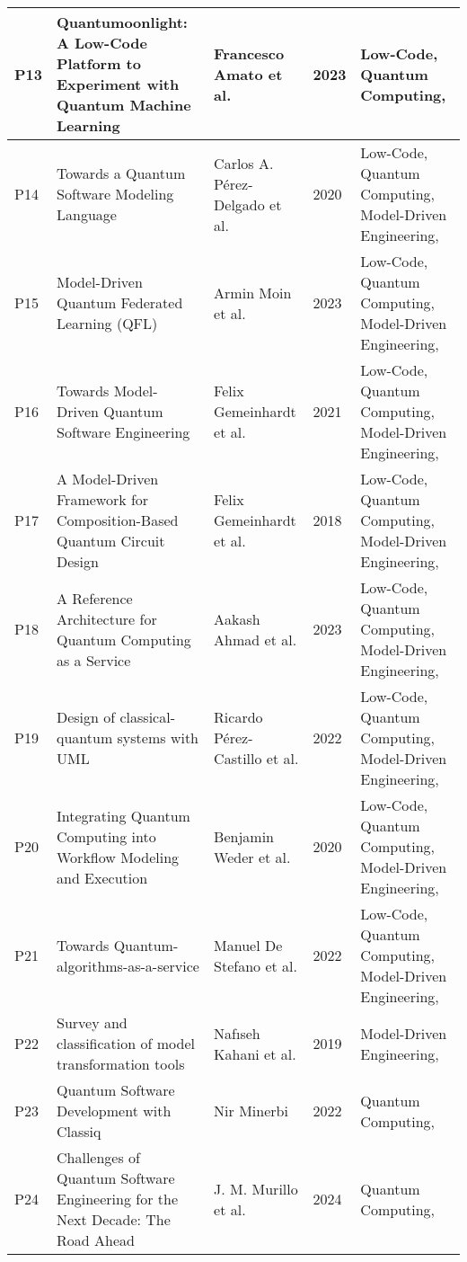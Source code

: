 \begin{longtable}{|m{0.8cm}|m{4.4cm}|m{3cm}|m{0.8cm}|m{4cm}|}
    P13 & Quantumoonlight: A Low-Code Platform to Experiment with Quantum Machine Learning & Francesco Amato et al. \cite{amato2023quantumoonlight} & 2023 & Low-Code, Quantum Computing,  \\ \hline
    P14 & Towards a Quantum Software Modeling Language & Carlos A. Pérez-Delgado et al. \cite{Perez-Delgado_2020} & 2020 & Low-Code, Quantum Computing, Model-Driven Engineering,  \\ \hline
    P15 & Model-Driven Quantum Federated Learning (QFL) & Armin Moin et al. \cite{Moin_2023} & 2023 & Low-Code, Quantum Computing, Model-Driven Engineering,  \\ \hline
    P16 & Towards Model-Driven Quantum Software Engineering & Felix Gemeinhardt et al. \cite{gemeinhardt_2021} & 2021 & Low-Code, Quantum Computing, Model-Driven Engineering,  \\ \hline
    P17 & A Model-Driven Framework for Composition-Based Quantum Circuit Design & Felix Gemeinhardt et al. \cite{Gemeinhardt_2018} & 2018 & Low-Code, Quantum Computing, Model-Driven Engineering,  \\ \hline
    P18 & A Reference Architecture for Quantum Computing as a Service & Aakash Ahmad et al. \cite{Ahmad_2023} & 2023 & Low-Code, Quantum Computing, Model-Driven Engineering,  \\ \hline
    P19 & Design of classical-quantum systems with UML & Ricardo Pérez-Castillo et al. \cite{perez2022design} & 2022 & Low-Code, Quantum Computing, Model-Driven Engineering,  \\ \hline
    P20 & Integrating Quantum Computing into Workflow Modeling and Execution & Benjamin Weder et al. \cite{Weder_2020} & 2020 & Low-Code, Quantum Computing, Model-Driven Engineering,  \\ \hline
    P21 & Towards Quantum-algorithms-as-a-service & Manuel De Stefano et al. \cite{Stefano_2022} & 2022 & Low-Code, Quantum Computing, Model-Driven Engineering,  \\ \hline
    P22 & Survey and classification of model transformation tools & Nafıseh Kahani et al. \cite{Kahani_2019} & 2019 & Model-Driven Engineering,  \\ \hline
    P23 & Quantum Software Development with Classiq & Nir Minerbi \cite{minerbi2022quantum} & 2022 & Quantum Computing,  \\ \hline
    P24 & Challenges of Quantum Software Engineering for the Next Decade: The Road Ahead & J. M. Murillo et al. \cite{murillo2024challenges} & 2024 & Quantum Computing,  \\ \hline

\end{longtable}

